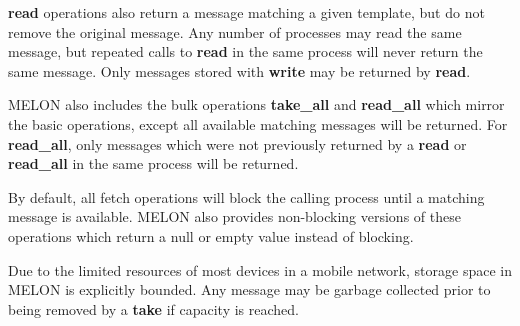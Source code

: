 \documentclass[lnicst]{svmultln}
\begin{document}
\textbf{read} operations also return a message matching a given template, but do not remove the original message. Any number of processes may read the same message, but repeated calls to \textbf{read} in the same process will never return the same message. Only messages stored with \textbf{write} may be returned by \textbf{read}.

MELON also includes the bulk operations \textbf{take\_all} and \textbf{read\_all} which mirror the basic operations, except all available matching messages will be returned. For \textbf{read\_all}, only messages which were not previously returned by a \textbf{read} or \textbf{read\_all} in the same process will be returned.

By default, all fetch operations will block the calling process until a matching message is available. MELON also provides non-blocking versions of these operations which return a null or empty value instead of blocking.

Due to the limited resources of most devices in a mobile network, storage space in MELON is explicitly bounded. Any message may be garbage collected prior to being removed by a \textbf{take} if capacity is reached.




\end{document}
